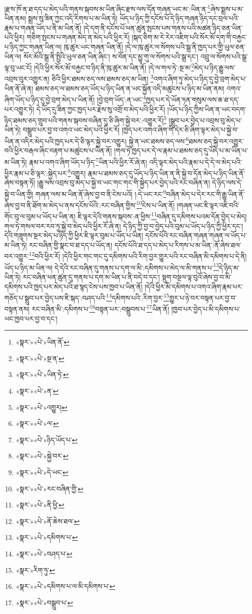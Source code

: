 །རྫས་ཁོ་ན་ཐ་དད་པ་མེད་པའི་གནས་སྐབས་མ་ཡིན་ཞིང་རྫས་ལས་དོན་གཞན་ཡང་མ་:ཡིན་ན་\footnote{«སྣར་»«པེ་»ཡིན་ནོ་}ཞེས་སྨྲས་པ་མ་ཡིན་ནམ། སྨྲས་སུ་ཟིན་ཀྱང་འདི་རིགས་པ་མ་ཡིན་ཏེ། ཡོད་པ་ཉིད་ཀྱི་དངོས་པོ་དེ་ཉིད་གཞན་ཉིད་དང་བྲལ་པའི་རྣམ་པ་གཞན་ཡོད་པ་ནི་མ་ཡིན་ནོ། །དེ་དག་ནི་དངོས་པོ་ཕན་ཚུན་སྤངས་པས་གནས་པའི་མཚན་ཉིད་ཅན་ཡིན་པའི་ཕྱིར། གཅིག་སྤངས་པ་གཞན་མེད་ན་མེད་པའི་ཕྱིར་རོ། །སྐད་ཅིག་མ་རེ་རེར་འཇིག་པའི་སོར་མོ་དག་གི་བརྐྱང་པ་ཉིད་ཀྱང་གཞན་ཡིན་ལ། ཁུ་ཚུར་ཡང་གཞན་ཡིན་ནོ། །དེ་ལ་ཁུ་ཚུར་ལ་སོགས་པའི་སྒྲ་ནི་ཁྱད་པར་གྱི་ཡུལ་ཅན་ཡིན་ལ། སོར་མོའི་སྒྲ་ནི་སྤྱིའི་ཡུལ་ཅན་ཡིན་ཞིང་། ས་བོན་དང་མྱུ་གུ་ལ་སོགས་པའི་སྒྲ་དང་། འབྲུ་ལ་སོགས་པའི་སྒྲ་ལྟ་བུ་ཡང་ངོ། །དེའི་ཕྱིར་སོར་མོ་བརྐྱང་བ་ཉིད་ནི་ཁུ་ཚུར་མ་ཡིན་ནོ། །དེ་ལ་གལ་ཏེ་:སྔ་མ་\footnote{«སྣར་»«པེ་»སྔ་ན་}མེད་པ་ཉིད་རྒྱུ་ལས་འབྲས་བུར་འགྱུར་ན། ཅིའི་ཕྱིར་ཐམས་ཅད་ལས་ཐམས་ཅད་མ་ཡིན། \footnote{«སྣར་»«པེ་»ཡིན་ཏེ་}འགའ་ཞིག་ཏུ་མེད་པ་ཉིད་དུ་བྱེ་བྲག་མེད་པ་ཡིན་ནོ་ཞེ་ན། ཐམས་ཅད་ལ་ཐམས་ཅད་ཡོད་པ་ཉིད་ཡིན་ན་ཡང་སྐྱོན་འདི་མཚུངས་པ་ཉིད་མ་ཡིན་ནམ། འགའ་ཞིག་ཡོད་པ་ཉིད་དུ་བྱེ་བྲག་མེད་པ་ཡིན་ནོ། །བྱེ་བྲག་ཡོད་:ན་ཡང་\footnote{«སྣར་»«པེ་»ན་}ཁྱད་པར་དེ་ཡོན་ཏན་གསུམ་ལས་ཆ་ཐ་དད་པར་འགྱུར་ཏེ། དེ་ཡོད་དུ་ཟིན་ཀྱང་ཁྱད་པར་རྗེས་སུ་འགྲོ་བ་མེད་པའི་ཕྱིར་རོ། །ཡོད་པ་ཉིད་ཀྱིས་ཡིན་ན་ཡང་བདག་ཉིད་ཐམས་ཅད་གྲུབ་པའི་གནས་སྐབས་བཞིན་དུ་ཅི་ཞིག་སྐྱེ་བར་:འགྱུར་རོ།\footnote{«སྣར་»«པེ་»འགྱུར།} །སྒྲུབ་པར་བྱེད་པ་འབྲས་བུ་མེད་པ་ཡིན་ཏེ། བསྒྲུབ་པར་བྱ་བ་འགའ་ཡང་མེད་པའི་ཕྱིར་རོ། །ཁྱད་པར་འགའ་ཞིག་གི་དེར་ཅི་ཞིག་ལྟར་མེད་པ་སྐྱེ་བ་ཡིན་ན་འདིར་མེད་པའི་ཁྱད་པར་དེ་ཅི་ལྟར་སྐྱེ་བར་འགྱུར། སྐྱེ་ན་ཡང་ཐམས་ཅད་ལས་\footnote{«སྣར་»«པེ་»ལ་}ཐམས་ཅད་སྐྱེ་བར་འགྱུར་བའི་ཕྱིར་བརྒལ་ཞིང་བརྟག་པ་མཚུངས་པ་ཡིན་ནོ། །གལ་ཏེ་ཁྱད་པར་དེ་ལ་རྣམ་པ་ཐམས་ཅད་དུ་ཡོད་པ་མ་ཡིན་པ་མ་ཡིན་ཏེ། རྣམ་པ་འགའ་ཞིག་ཡོད་པ་ཉིད་\footnote{«སྣར་»«པེ་»ཉིད་ཡོད་པ་}ཡིན་པའི་ཕྱིར་རོ་ཞེ་ན། འདི་ལྟར་མེད་པའི་རྣམ་པ་དེ་དེ་ལ་མེད་པའི་ཕྱིར་རྣམ་པ་ཅི་ལྟར་:སྐྱེད་པར་\footnote{«སྣར་»«པེ་»སྐྱེ་བར་}འགྱུར། རྣམ་པ་ཐམས་ཅད་དུ་ཡོད་པ་ཉིད་ཡིན་ན་ནི་སྐྱེ་བ་དོན་མེད་པ་ཉིད་ཡིན་ནོ་ཞེས་བསྟན་ཏོ། །རྒྱུ་ལས་འབྲས་བུ་མེད་པ་སྐྱེ་བ་ཡང་གང་གང་གི་སྐྱེད་པར་བྱེད་པའི་རང་བཞིན་ན། དེ་ཉིད་ལས་དེ་སྐྱེ་བ་ཡིན་གྱི། གཞན་ལས་མ་ཡིན་ནོ་ཞེས་བྱ་བ་ནི་ངེས་པའོ། །:དེ་ཡང་རང་\footnote{«སྣར་»«པེ་»དེ་ཡང་}བཞིན་མེད་པ་དེར་རང་གི་རྒྱུ་ཡིན་ནོ་ཞེས་བྱ་བ་ནི་ཐོག་མ་མེད་པ་ནས་དངོས་པོའི་:རང་བཞིན་གྱིས་\footnote{«སྣར་»«པེ་»རང་བཞིན་གྱི་}ངེས་པ་ཡིན་ནོ། །གཞན་ཡང་ཇི་ལྟར་འཇི་བའི་གོང་བུ་ལ་བུམ་པ་ཡོད་པ་ཡིན་ན། ཇི་ལྟར་དེའི་གནས་སྐབས་:ན་ཕྱིས་\footnote{«སྣར་»«པེ་»ནི་ཕྱི་}བཞིན་དུ་དམིགས་པའམ་དོན་བྱེད་པ་མེད། གལ་ཏེ་གསལ་བར་རབ་ཏུ་སྐྱེ་བ་མེད་པའི་ཕྱིར་རོ་ཞེ་ན། དེ་ཉིད་ཀྱི་བྱ་བ་བྱེད་པའི་བུམ་པ་ཡོད་པ་ཉིད་ཀྱི་ཕྱིར་དང་། དེའི་གཟུགས་སྔར་མེད་པ་ཉིད་ཀྱི་ཕྱིར་ཇི་ལྟར་བུམ་པ་ཡོད་པ་ཡིན། དངོས་པོའི་རང་བཞིན་གཞན་གཞན་ལ་ཡོད་པ་མ་ཡིན་ཏེ། རང་བཞིན་གྱི་སྣང་བ་ཐ་དད་པ་ཡོད་ན། དངོས་པོའི་ཐ་དད་པ་མེད་པ་རིགས་པ་མ་ཡིན་:ནོ་ཞེས་ཐལ་བར་འགྱུར་\footnote{«སྣར་»«པེ་»ནོ་ཆེས་ཐལ་}བའི་ཕྱིར་རོ། །དེའི་ཕྱིར་གང་གང་དུ་དམིགས་པའི་རིག་བྱར་གྱུར་པའི་རང་བཞིན་མི་དམིགས་པ་དེ་ནི། ཡོད་པ་ཉིད་མ་ཡིན་ལ། དེ་དེའི་རང་བཞིན་དུ་གནས་པ་དག་ལ་མི་:དམིགས་པ་མེད་ལ་མི་གནས་པ་\footnote{«སྣར་»«པེ་»དམིགས་པ་}དེ་ཉིད་མ་ཡིན་ཏེ། རང་བཞིན་ཕན་ཚུན་དུ་གནས་པ་དག་མ་ཡིན་པ་ནི་བདེ་བ་དང་། སྡུག་བསྔལ་ལྟ་བུའོ་ཞེས་བྱ་བ་མི་དམིགས་པའི་ཁྱད་པར་མེད་པའི་ཐ་སྙད་ངེས་པས་ཁྱབ་པ་ཡིན་ནོ། །དེའི་ཕྱིར་མི་དམིགས་པ་འགའ་ཞིག་རྣམ་པར་གཅོད་པ་སྒྲུབ་པར་བྱེད་པས་ཇི་སྐད་:བཤད་པའི་\footnote{«སྣར་»«པེ་»བཤད་པ་}དམིགས་པའི་:རིག་བྱར་\footnote{«སྣར་»རིག་ཏུ་}གྱུར་པ་ཉེ་བར་བསྟན་པར་བྱ་བ་བསྟན་ནས། རང་བཞིན་མི་:དམིགས་པ་\footnote{«སྣར་»«པེ་»དམིགས་པ་ལ་མི་དམིགས་པ་}བསྟན་པར་:བསྒྲུབས་པ་\footnote{«སྣར་»«པེ་»བསྒྲུབ་པ་}ཡིན་ནོ། །ཁྱབ་པར་བྱེད་པ་མི་དམིགས་པ་ཡང་ཁྱབ་པར་བྱ་བ་དང་། 